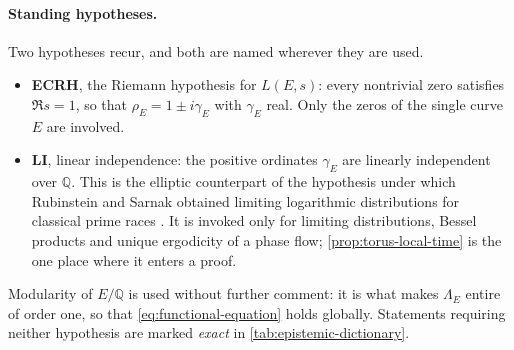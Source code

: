 \documentclass[11pt,reqno]{amsart}
\theoremstyle{remark}
\newcommand{\Q}{\mathbb{Q}}
\begin{document}
\paragraph{Standing hypotheses.}
Two hypotheses recur, and both are named wherever they are used.
\begin{itemize}
  \item \textbf{ECRH}, the Riemann hypothesis for $L(E,s)$: every nontrivial zero satisfies $\Re s=1$, so that $\rho_E=1\pm i\gamma_E$ with $\gamma_E$ real.  Only the zeros of the single curve $E$ are involved.
  \item \textbf{LI}, linear independence: the positive ordinates $\gamma_E$ are linearly independent over $\Q$.  This is the elliptic counterpart of the hypothesis under which Rubinstein and Sarnak obtained limiting logarithmic distributions for classical prime races \cite{RubinsteinSarnak1994}.  It is invoked only for limiting distributions, Bessel products and unique ergodicity of a phase flow; \cref{prop:torus-local-time} is the one place where it enters a proof.
\end{itemize}
Modularity of $E/\Q$ \cite{Wiles1995,BCDT2001} is used without further comment: it is what makes $\Lambda_E$ entire of order one, so that \eqref{eq:functional-equation} holds globally.  Statements requiring neither hypothesis are marked \emph{exact} in \cref{tab:epistemic-dictionary}.
\end{document}

